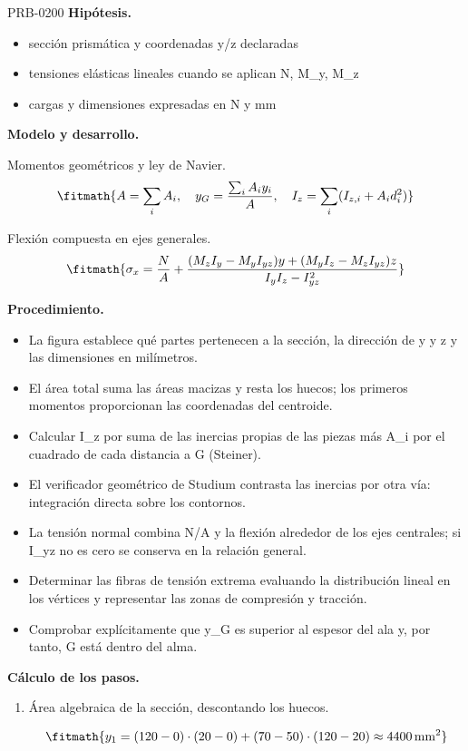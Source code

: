 \begin{studiumworked}{PRB-0200}
\textbf{Hipótesis.}\begin{itemize}\item sección prismática y coordenadas y/z declaradas
\item tensiones elásticas lineales cuando se aplican N, M\_y, M\_z
\item cargas y dimensiones expresadas en N y mm\end{itemize}

\textbf{Modelo y desarrollo.}

Momentos geométricos y ley de Navier.\[\fitmath{A = \sum_i A_i,\quad y_G = \frac{\sum_i A_i y_i}{A},\quad I_z = \sum_i (I_{z,i}+A_i d_i^2)}\]

Flexión compuesta en ejes generales.\[\fitmath{\sigma_x = \frac{N}{A}+\frac{(M_z I_y-M_y I_{yz})y+(M_y I_z-M_z I_{yz})z}{I_y I_z-I_{yz}^{2}}}\]

\textbf{Procedimiento.}\begin{itemize}\item La figura establece qué partes pertenecen a la sección, la dirección de y y z y las dimensiones en milímetros.
\item El área total suma las áreas macizas y resta los huecos; los primeros momentos proporcionan las coordenadas del centroide.
\item Calcular I\_z por suma de las inercias propias de las piezas más A\_i por el cuadrado de cada distancia a G (Steiner).
\item El verificador geométrico de Studium contrasta las inercias por otra vía: integración directa sobre los contornos.
\item La tensión normal combina N/A y la flexión alrededor de los ejes centrales; si I\_yz no es cero se conserva en la relación general.
\item Determinar las fibras de tensión extrema evaluando la distribución lineal en los vértices y representar las zonas de compresión y tracción.
\item Comprobar explícitamente que y\_G es superior al espesor del ala y, por tanto, G está dentro del alma.\end{itemize}

\textbf{Cálculo de los pasos.}

\begin{enumerate}

\item Área algebraica de la sección, descontando los huecos.

\[\fitmath{y_{1}=\left(120-0\right)\cdot \left(20-0\right)+\left(70-50\right)\cdot \left(120-20\right)\approx 4400\,\mathrm{mm^{2}}}\]


\end{enumerate}
\end{studiumworked}
